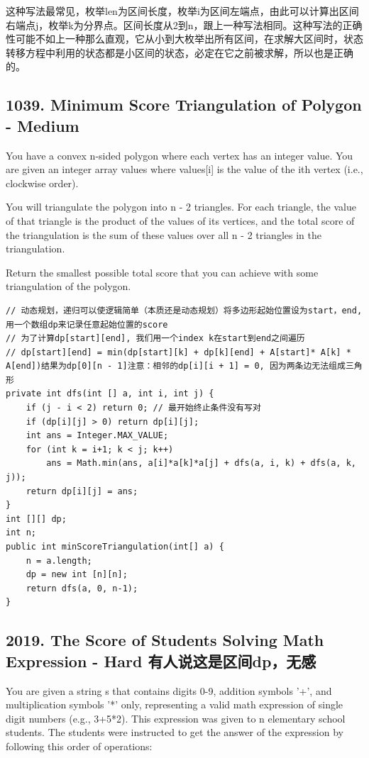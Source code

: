 \documentclass[9pt, b5paaper]{book}
\begin{document}
这种写法最常见，枚举len为区间长度，枚举i为区间左端点，由此可以计算出区间右端点j，枚举k为分界点。区间长度从2到n，跟上一种写法相同。这种写法的正确性可能不如上一种那么直观，它从小到大枚举出所有区间，在求解大区间时，状态转移方程中利用的状态都是小区间的状态，必定在它之前被求解，所以也是正确的。

\subsection{1039. Minimum Score Triangulation of Polygon - Medium}
\label{sec-1-3-1}
You have a convex n-sided polygon where each vertex has an integer value. You are given an integer array values where values[i] is the value of the ith vertex (i.e., clockwise order).

You will triangulate the polygon into n - 2 triangles. For each triangle, the value of that triangle is the product of the values of its vertices, and the total score of the triangulation is the sum of these values over all n - 2 triangles in the triangulation.

Return the smallest possible total score that you can achieve with some triangulation of the polygon.

\begin{verbatim}
// 动态规划，递归可以使逻辑简单（本质还是动态规划）将多边形起始位置设为start，end, 用一个数组dp来记录任意起始位置的score
// 为了计算dp[start][end], 我们用一个index k在start到end之间遍历
// dp[start][end] = min(dp[start][k] + dp[k][end] + A[start]* A[k] * A[end])结果为dp[0][n - 1]注意：相邻的dp[i][i + 1] = 0, 因为两条边无法组成三角形
private int dfs(int [] a, int i, int j) {
    if (j - i < 2) return 0; // 最开始终止条件没有写对
    if (dp[i][j] > 0) return dp[i][j];
    int ans = Integer.MAX_VALUE;
    for (int k = i+1; k < j; k++) 
        ans = Math.min(ans, a[i]*a[k]*a[j] + dfs(a, i, k) + dfs(a, k, j));
    return dp[i][j] = ans;
}
int [][] dp;
int n;
public int minScoreTriangulation(int[] a) {
    n = a.length;
    dp = new int [n][n];
    return dfs(a, 0, n-1);
}
\end{verbatim}

\subsection{2019. The Score of Students Solving Math Expression - Hard 有人说这是区间dp，无感}
\label{sec-1-3-2}
You are given a string s that contains digits 0-9, addition symbols '+', and multiplication symbols '*' only, representing a valid math expression of single digit numbers (e.g., 3+5*2). This expression was given to n elementary school students. The students were instructed to get the answer of the expression by following this order of operations:
\end{document}
